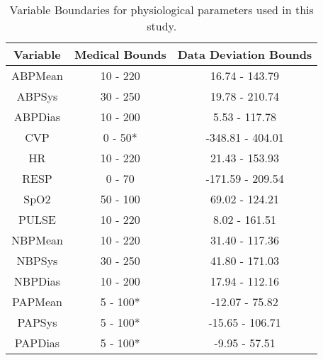 \begin{table}[h]
 \caption{\label{tab:varBoundaries}Variable Boundaries for physiological parameters used in this study.}
\centering 
\begin{tabular}{@{\extracolsep{\fill}} c c c} %
\toprule
Variable  & Medical Bounds  & Data Deviation Bounds\tabularnewline
\midrule
ABPMean  & 10 - 220  & 16.74 - 143.79\tabularnewline
\cline{2-3}
ABPSys  & 30 - 250  & 19.78 - 210.74\tabularnewline
\cline{2-3}
ABPDias  & 10 - 200  & 5.53 - 117.78\tabularnewline
\cline{2-3}
CVP  & 0 - 50{*}  & -348.81 - 404.01\tabularnewline
\cline{2-3}
HR  & 10 - 220  & 21.43 - 153.93\tabularnewline
\cline{2-3}
RESP &  0 - 70  &  -171.59 - 209.54\tabularnewline
\cline{2-3}
SpO2  & 50 - 100  & 69.02 - 124.21\tabularnewline
\cline{2-3}
PULSE  & 10 - 220  & 8.02 - 161.51\tabularnewline
\cline{2-3}
NBPMean  & 10 - 220  & 31.40 - 117.36\tabularnewline
\cline{2-3}
NBPSys  & 30 - 250  & 41.80 - 171.03\tabularnewline
\cline{2-3}
NBPDias  & 10 - 200  & 17.94 - 112.16\tabularnewline
\cline{2-3}
PAPMean  &  5 - 100{*}  &  -12.07 - 75.82\tabularnewline
\cline{2-3}
PAPSys  &  5 - 100{*}  &  -15.65 - 106.71\tabularnewline
\cline{2-3}
PAPDias  &  5 - 100{*}  &  -9.95 - 57.51\tabularnewline
\bottomrule
\end{tabular}
\end{table}




